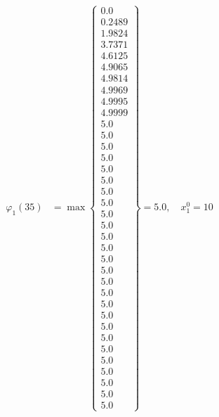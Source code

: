 \documentclass{article}
\begin{document}
\begin{align*}
\varphi_{1}(35) &= \max \left\{ \begin{array}{c}
0.0 \\
 0.2489 \\
 1.9824 \\
 3.7371 \\
 4.6125 \\
 4.9065 \\
 4.9814 \\
 4.9969 \\
 4.9995 \\
 4.9999 \\
 5.0 \\
 5.0 \\
 5.0 \\
 5.0 \\
 5.0 \\
 5.0 \\
 5.0 \\
 5.0 \\
 5.0 \\
 5.0 \\
 5.0 \\
 5.0 \\
 5.0 \\
 5.0 \\
 5.0 \\
 5.0 \\
 5.0 \\
 5.0 \\
 5.0 \\
 5.0 \\
 5.0 \\
 5.0 \\
 5.0 \\
 5.0 \\
 5.0 \\
 5.0
\end{array} \right\}=5.0, \quad x_{1}^0=10\\
  

\end{align*}
\end{document}

